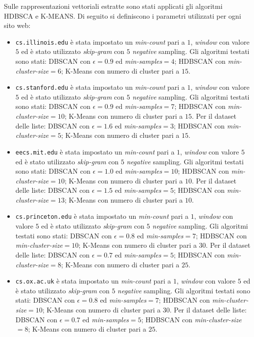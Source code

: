 Sulle rappresentazioni vettoriali estratte sono stati applicati gli algoritmi HDBSCA e K-MEANS.
Di seguito si definiscono i parametri utilizzati per ogni sito web: 
\begin{itemize}
\item \texttt{cs.illinois.edu} è stata impostato un \textit{min-count} pari a $1$, \textit{window} con valore $5$ ed è stato utilizzato \textit{skip-gram} con $5$ \textit{negative} sampling. Gli algoritmi testati sono stati: DBSCAN con $\epsilon = 0.9$ ed \textit{min-samples}$ = 4$; HDBSCAN con \textit{min-cluster-size}$=6$; K-Means con numero di cluster pari a $15$. 
\item \texttt{cs.stanford.edu} è stata impostato un \textit{min-count} pari a $1$, \textit{window} con valore $5$ ed è stato utilizzato \textit{skip-gram} con $5$ \textit{negative} sampling. Gli algoritmi testati sono stati: DBSCAN con $\epsilon = 0.9$ ed \textit{min-samples}$ = 7$; HDBSCAN con \textit{min-cluster-size}$=10$; K-Means con numero di cluster pari a $15$. Per il dataset delle liste: DBSCAN con $\epsilon = 1.6$ ed \textit{min-samples}$ = 3$; HDBSCAN con \textit{min-cluster-size}$=5$; K-Means con numero di cluster pari a $15$.
\item \texttt{eecs.mit.edu} è stata impostato un \textit{min-count} pari a $1$, \textit{window} con valore $5$ ed è stato utilizzato \textit{skip-gram} con $5$ \textit{negative} sampling. Gli algoritmi testati sono stati: DBSCAN con $\epsilon = 1.0$ ed \textit{min-samples}$ = 10$; HDBSCAN con \textit{min-cluster-size}$=10$; K-Means con numero di cluster pari a $10$. Per il dataset delle liste: DBSCAN con $\epsilon = 1.5$ ed \textit{min-samples}$ = 5$; HDBSCAN con \textit{min-cluster-size}$=13$; K-Means con numero di cluster pari a $10$.
\item \texttt{cs.princeton.edu} è stata impostato un \textit{min-count} pari a $1$, \textit{window} con valore $5$ ed è stato utilizzato \textit{skip-gram} con $5$ \textit{negative} sampling. Gli algoritmi testati sono stati: DBSCAN con $\epsilon = 0.8$ ed \textit{min-samples}$ = 7$; HDBSCAN con \textit{min-cluster-size}$=10$; K-Means con numero di cluster pari a $30$. Per il dataset delle liste: DBSCAN con $\epsilon = 0.7$ ed \textit{min-samples}$ = 5$; HDBSCAN con \textit{min-cluster-size}$=8$; K-Means con numero di cluster pari a $25$.
\item \texttt{cs.ox.ac.uk} è stata impostato un \textit{min-count} pari a $1$, \textit{window} con valore $5$ ed è stato utilizzato \textit{skip-gram} con $5$ \textit{negative} sampling. Gli algoritmi testati sono stati: DBSCAN con $\epsilon = 0.8$ ed \textit{min-samples}$ = 7$; HDBSCAN con \textit{min-cluster-size}$=10$; K-Means con numero di cluster pari a $30$. Per il dataset delle liste: DBSCAN con $\epsilon = 0.7$ ed \textit{min-samples}$ = 5$; HDBSCAN con \textit{min-cluster-size}$=8$; K-Means con numero di cluster pari a $25$.
\end{itemize}

